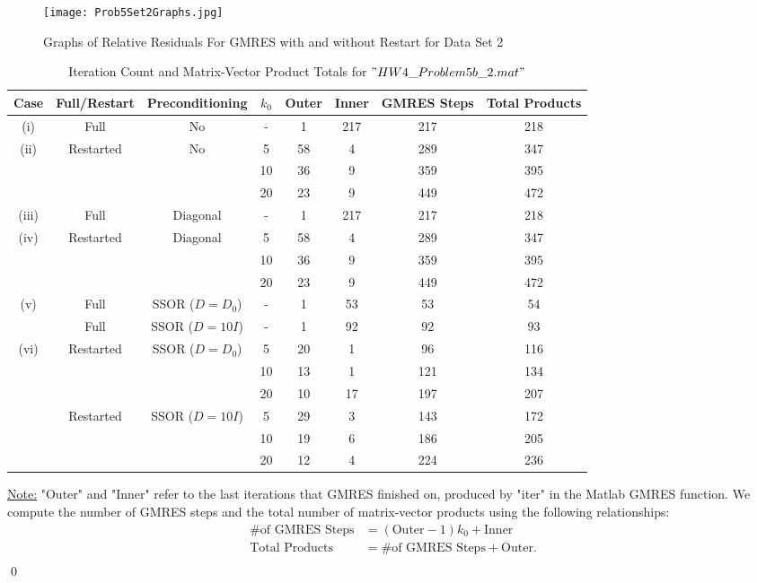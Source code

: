 \documentclass[12pt]{article}
\begin{document}
\begin{figure}[H]
\hspace{-.3in}
\texttt{[image: Prob5Set2Graphs.jpg]}
\caption{Graphs of Relative Residuals For GMRES with and without Restart for Data Set 2}
\end{figure}


\begin{table}[H]
\renewcommand{\arraystretch}{1.3}
\hspace{-.35in}
\begin{small}
\begin{tabular}{| c || c | c | c | c | c || c | c |}
\hline
\textbf{Case} &  \textbf{Full/Restart} & \textbf{Preconditioning} & \textbf{$k_0$} & \textbf{Outer} & \textbf{Inner} & \textbf{GMRES Steps} & \textbf{Total Products}\\
\hline 
\hline
(i)  & Full & No & - & 1 & 217 & 217 & 218 \\
\hline
(ii) & Restarted & No & 5 & 58 & 4 & 289 &  347\\
  &  &  & 10 & 36 & 9 & 359 &  395\\
  &  &  & 20 & 23 & 9 & 449 &  472\\
\hline
(iii) & Full & Diagonal & - & 1 & 217 & 217 & 218 \\
\hline
(iv) & Restarted & Diagonal & 5 & 58 & 4 & 289 &  347\\
  &  &  & 10 & 36 & 9 & 359 &  395\\
  &  &  & 20 & 23 & 9 & 449 &  472\\
\hline
(v) & Full & SSOR ($D=D_0$) & - & 1 & 53 & 53 & 54 \\
\hline
 & Full & SSOR ($D=10I$) & - & 1 & 92 & 92 & 93 \\
\hline
(vi) & Restarted & SSOR ($D=D_0$) & 5 & 20 & 1 & 96 & 116\\
  &  &  & 10 & 13 & 1 & 121 &  134\\
  &  &  & 20 & 10 & 17 & 197 &  207\\
\hline
 & Restarted & SSOR ($D=10I$) & 5 & 29 & 3 & 143 &  172\\
  &  &  & 10 & 19 & 6 & 186 & 205 \\
  &  &  & 20 & 12 & 4 & 224 &  236\\
\hline
\end{tabular}
\end{small}
\caption{Iteration Count and Matrix-Vector Product Totals for $"HW4\_Problem5b\_2.mat"$}
\end{table}
\noindent
\underline{Note:} "Outer" and "Inner" refer to the last iterations that GMRES finished on, produced by "iter" in the Matlab GMRES function.  We compute the number of GMRES steps and the total number of matrix-vector products using the following relationships:
\begin{align*}
\text{\# of GMRES Steps} &= (\text{Outer}-1)k_0 + \text{Inner} \\
\text{Total Products} &= \text{\# of GMRES Steps} + \text{Outer}. \\
\end{align*}
\qed\\
\end{document}
